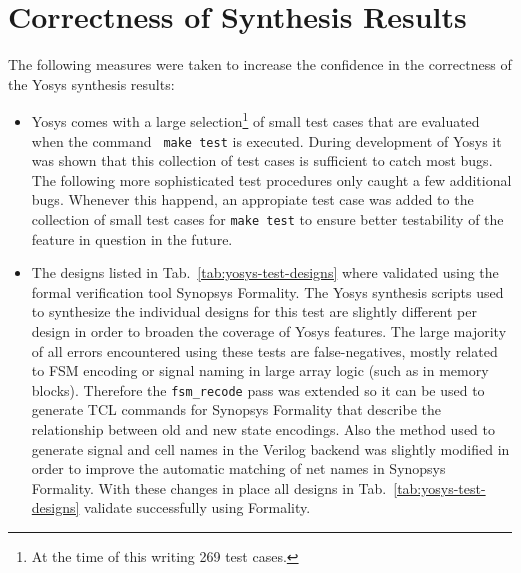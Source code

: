 
\section{Correctness of Synthesis Results}

The following measures were taken to increase the confidence in the correctness of the Yosys synthesis results:

\begin{itemize}
\item Yosys comes with a large selection\footnote{At the time of this writing
269 test cases.} of small test cases that are evaluated when the command {\tt
make test} is executed. During development of Yosys it was shown that this
collection of test cases is sufficient to catch most bugs. The following more
sophisticated test procedures only caught a few additional bugs. Whenever this
happend, an appropiate test case was added to the collection of small test
cases for {\tt make test} to ensure better testability of the feature in
question in the future.

\item The designs listed in Tab.~\ref{tab:yosys-test-designs} where validated
using the formal verification tool Synopsys Formality.
The Yosys synthesis scripts used to synthesize the individual designs for this
test are slightly different per design in order to broaden the coverage of
Yosys features. The large majority of all errors encountered using these tests
are false-negatives, mostly related to FSM encoding or signal naming in large
array logic (such as in memory blocks). Therefore the {\tt fsm\_recode} pass
was extended so it can be used to generate TCL commands for Synopsys Formality
that describe the relationship between old and new state encodings. Also the
method used to generate signal and cell names in the Verilog backend was
slightly modified in order to improve the automatic matching of net names in
Synopsys Formality. With these changes in place all designs in Tab.~\ref{tab:yosys-test-designs}
validate successfully using Formality.


\end{itemize}
